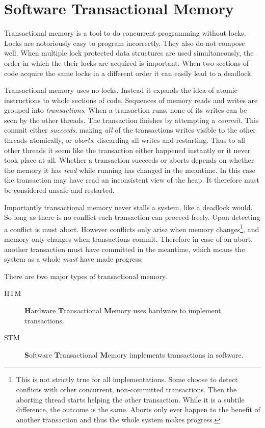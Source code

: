\section{Software Transactional Memory}

\label{sec:stm}

Transactional memory is a tool to do concurrent programming without locks. Locks
are notoriously easy to program incorrectly. They also do not compose well.
When multiple lock protected data structures are used simultaneously, the order
in which the their locks are acquired is important. When two sections of code
acquire the same locks in a different order it can easily lead to a deadlock.

Transactional memory uses no locks. Instead it expands the idea of atomic
instructions to whole sections of code. Sequences of memory reads and writes are
grouped into \emph{transactions}. When a transaction runs, none of its writes
can be seen by the other threads. The transaction finishes by attempting a
\emph{commit}. This commit either \emph{succeeds}, making \emph{all} of the
transactions writes visible to the other threads atomically, or \emph{aborts},
discarding all writes and restarting. Thus to all other threads it seem like the
transaction either happened instantly or it never took place at all. Whether a
transaction succeeds or aborts depends on whether the memory it has \emph{read}
while running has changed in the meantime. In this case the transaction may have
read an inconsistent view of the heap. It therefore must be considered unsafe
and restarted.

Importantly transactional memory never stalls a system, like a deadlock would.
So long as there is no conflict each transaction can proceed freely. Upon
detecting a conflict is must abort. However conflicts only arise when memory
changes\footnote{This is not strictly true for all implementations. Some choose
  to detect conflicts with other concurrent, non-committed transactions. Then
  the aborting thread starts helping the other transaction. While it is a
  subtile difference, the outcome is the same. Aborts only ever happen to the
  benefit of another transaction and thus the whole system makes progress.}, and
memory only changes when transactions commit. Therefore in case of an abort,
another transaction must have committed in the meantime, which means the system
as a whole \emph{must} have made progress.

There are two major types of transactional memory.
\begin{description}
\item[HTM] \textbf{H}ardware \textbf{T}ransactional \textbf{M}emory uses
  hardware to implement transactions.
\item[STM] \textbf{S}oftware \textbf{T}ransactional \textbf{M}emory implements
  transactions in software.
\end{description}

